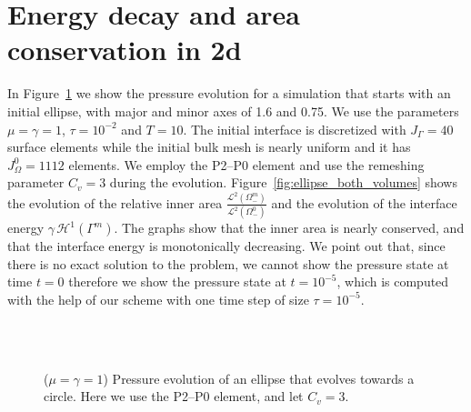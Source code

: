 \section{Energy decay and area conservation in 2d}\label{sec:stokes_2d_energy}
In Figure~\ref{fig:ellipse_both} we show the pressure evolution for a
simulation that starts with an initial ellipse, with major and minor axes of
1.6 and 0.75. We use the parameters $\mu = \gamma=1$, $\tau=10^{-2}$ and
$T=10$. The initial interface is discretized with $J_\Gamma = 40$ surface
elements while the initial bulk mesh is nearly uniform and it has $J_\Omega^0 =
1112$ elements. We employ the P2--P0 element and use the remeshing parameter
$C_v=3$ during the evolution. Figure~\ref{fig:ellipse_both_volumes} shows the
evolution of the relative inner area
$\frac{\mathcal{L}^2(\Omega^m_-)}{\mathcal{L}^2(\Omega^0_-)}$ and the
evolution of the interface energy $\gamma\,\mathcal{H}^{1}(\Gamma^m)$. The
graphs show that the inner area is nearly conserved, and that the interface
energy is monotonically decreasing. We point out that, since there is no exact
solution to the problem, we cannot show the pressure state at time $t=0$
therefore we show the pressure state at $t=10^{-5}$, which is computed with the
help of our scheme with one time step of size $\tau=10^{-5}$.
\begin{figure}[htbp]
\centering
{}\\
\\
\caption[Stokes ellipse pressure]
{($\mu=\gamma=1$) Pressure evolution of an ellipse that evolves towards a
circle. Here we use the P2--P0 element, and let $C_v = 3$.}
\label{fig:ellipse_both}
\end{figure}
